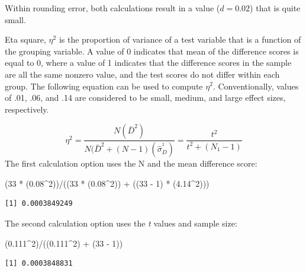 \documentclass[
  11pt,
]{book}
\newenvironment{Shaded}{\begin{snugshade}}{\end{snugshade}}
\newcommand{\DecValTok}[1]{\textcolor[rgb]{0.00,0.00,0.81}{#1}}
\newcommand{\FloatTok}[1]{\textcolor[rgb]{0.00,0.00,0.81}{#1}}
\newcommand{\NormalTok}[1]{#1}
\newcommand{\SpecialCharTok}[1]{\textcolor[rgb]{0.00,0.00,0.00}{#1}}
\begin{document}
Within rounding error, both calculations result in a value (\(d = 0.02\)) that is quite small.

Eta square, \(\eta^2\) is the proportion of variance of a test variable that is a function of the grouping variable. A value of 0 indicates that mean of the difference scores is equal to 0, where a value of 1 indicates that the difference scores in the sample are all the same nonzero value, and the test scores do not differ within each group. The following equation can be used to compute \(\eta^2\). Conventionally, values of .01, .06, and .14 are considered to be small, medium, and large effect sizes, respectively.

\[\eta^{2} =\frac{N(\bar{D}^{2})}{N(\bar{D}^{2}+(N-1)(\hat\sigma_D^{^{2}})}=\frac{t^{2}}{{t^{2}+(N_{1}-1)}}\]
The first calculation option uses the N and the mean difference score:

\begin{Shaded}
\begin{Highlighting}[]
\NormalTok{(}\DecValTok{33} \SpecialCharTok{*}\NormalTok{ (}\FloatTok{0.08}\SpecialCharTok{\^{}}\DecValTok{2}\NormalTok{))}\SpecialCharTok{/}\NormalTok{((}\DecValTok{33} \SpecialCharTok{*}\NormalTok{ (}\FloatTok{0.08}\SpecialCharTok{\^{}}\DecValTok{2}\NormalTok{)) }\SpecialCharTok{+}\NormalTok{ ((}\DecValTok{33} \SpecialCharTok{{-}} \DecValTok{1}\NormalTok{) }\SpecialCharTok{*}\NormalTok{ (}\FloatTok{4.14}\SpecialCharTok{\^{}}\DecValTok{2}\NormalTok{)))}
\end{Highlighting}
\end{Shaded}

\begin{verbatim}
[1] 0.0003849249
\end{verbatim}

The second calculation option uses the \emph{t} values and sample size:

\begin{Shaded}
\begin{Highlighting}[]
\NormalTok{(}\FloatTok{0.111}\SpecialCharTok{\^{}}\DecValTok{2}\NormalTok{)}\SpecialCharTok{/}\NormalTok{((}\FloatTok{0.111}\SpecialCharTok{\^{}}\DecValTok{2}\NormalTok{) }\SpecialCharTok{+}\NormalTok{ (}\DecValTok{33} \SpecialCharTok{{-}} \DecValTok{1}\NormalTok{))}
\end{Highlighting}
\end{Shaded}

\begin{verbatim}
[1] 0.0003848831
\end{verbatim}
\end{document}
